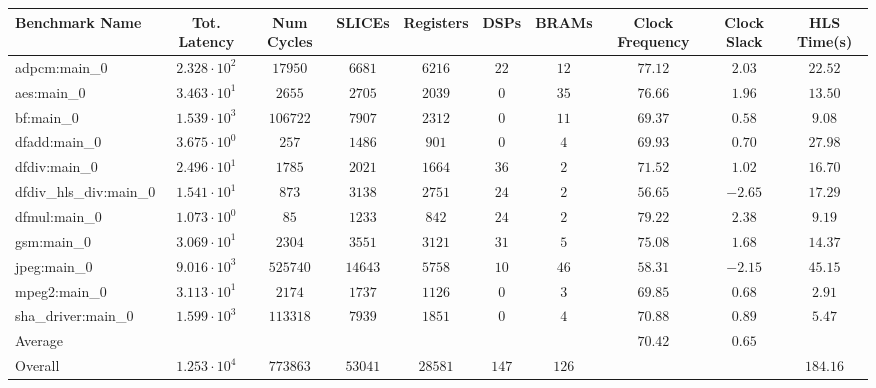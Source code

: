 \begin{tabular}{|l|c|c|c|c|c|c|c|c|c|}
\hline
Benchmark Name          & Tot. Latency           & Num Cycles & SLICEs    & Registers & DSPs    & BRAMs   & Clock Frequency & Clock Slack & HLS Time(s) \\
\hline
adpcm:main\_0           & $ 2.328 \cdot 10^{2} $ & $ 17950  $ & $ 6681  $ & $ 6216  $ & $ 22  $ & $ 12  $ & $ 77.12       $ & $ 2.03    $ & $ 22.52   $ \\
aes:main\_0             & $ 3.463 \cdot 10^{1} $ & $ 2655   $ & $ 2705  $ & $ 2039  $ & $ 0   $ & $ 35  $ & $ 76.66       $ & $ 1.96    $ & $ 13.50   $ \\
bf:main\_0              & $ 1.539 \cdot 10^{3} $ & $ 106722 $ & $ 7907  $ & $ 2312  $ & $ 0   $ & $ 11  $ & $ 69.37       $ & $ 0.58    $ & $ 9.08    $ \\
dfadd:main\_0           & $ 3.675 \cdot 10^{0} $ & $ 257    $ & $ 1486  $ & $ 901   $ & $ 0   $ & $ 4   $ & $ 69.93       $ & $ 0.70    $ & $ 27.98   $ \\
dfdiv:main\_0           & $ 2.496 \cdot 10^{1} $ & $ 1785   $ & $ 2021  $ & $ 1664  $ & $ 36  $ & $ 2   $ & $ 71.52       $ & $ 1.02    $ & $ 16.70   $ \\
dfdiv\_hls\_div:main\_0 & $ 1.541 \cdot 10^{1} $ & $ 873    $ & $ 3138  $ & $ 2751  $ & $ 24  $ & $ 2   $ & $ 56.65       $ & $ -2.65   $ & $ 17.29   $ \\
dfmul:main\_0           & $ 1.073 \cdot 10^{0} $ & $ 85     $ & $ 1233  $ & $ 842   $ & $ 24  $ & $ 2   $ & $ 79.22       $ & $ 2.38    $ & $ 9.19    $ \\
gsm:main\_0             & $ 3.069 \cdot 10^{1} $ & $ 2304   $ & $ 3551  $ & $ 3121  $ & $ 31  $ & $ 5   $ & $ 75.08       $ & $ 1.68    $ & $ 14.37   $ \\
jpeg:main\_0            & $ 9.016 \cdot 10^{3} $ & $ 525740 $ & $ 14643 $ & $ 5758  $ & $ 10  $ & $ 46  $ & $ 58.31       $ & $ -2.15   $ & $ 45.15   $ \\
mpeg2:main\_0           & $ 3.113 \cdot 10^{1} $ & $ 2174   $ & $ 1737  $ & $ 1126  $ & $ 0   $ & $ 3   $ & $ 69.85       $ & $ 0.68    $ & $ 2.91    $ \\
sha\_driver:main\_0     & $ 1.599 \cdot 10^{3} $ & $ 113318 $ & $ 7939  $ & $ 1851  $ & $ 0   $ & $ 4   $ & $ 70.88       $ & $ 0.89    $ & $ 5.47    $ \\
\hline
Average                 & $                    $ & $        $ & $       $ & $       $ & $     $ & $     $ & $ 70.42       $ & $ 0.65    $ & $         $ \\
\hline
Overall                 & $ 1.253 \cdot 10^{4} $ & $ 773863 $ & $ 53041 $ & $ 28581 $ & $ 147 $ & $ 126 $ & $             $ & $         $ & $ 184.16  $ \\
\hline
\end{tabular}
